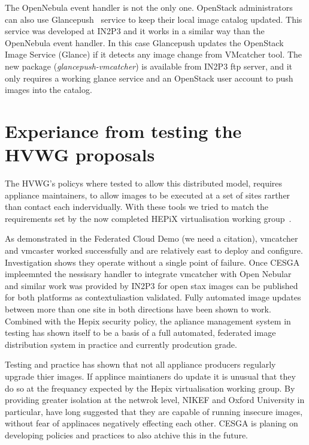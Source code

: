 \documentclass{llncs_Ibergrid2013}
\begin{document}
The OpenNebula event handler is not the only one. OpenStack administrators can also use Glancepush~\cite{glancepush} service to keep their local image catalog updated. 
This service was developed at IN2P3 and it works in a similar way than the OpenNebula event handler. 
In this case Glancepush updates the OpenStack Image Service (Glance) if it detects any image change from VMcatcher tool. 
The new package (\textit{glancepush-vmcatcher}) is available from IN2P3 ftp server, and it only requires a working glance service and an OpenStack user account to push images into the catalog.



\section{Experiance from testing the HVWG proposals}
\label{sect-experiances}

The HVWG's policys where tested to allow this distributed model, requires appliance maintainers, to allow images to be executed at a set of sites rarther than contact each indervidually. With these tools we tried to match the requirements set by the now completed HEPiX virtualisation working group~\cite{hepix}.

As demonstrated in the Federated Cloud Demo (we need a citation), vmcatcher and vmcaster worked successfully and are relatively east to deploy and configure. Investigation shows they operate without a single point of failure. Once CESGA impleemnted the nessisary handler to integrate vmcatcher with Open Nebular and similar work was provided by IN2P3 for open stax images can be published for both platforms as contextuliastion validated. Fully automated image updates between more than one site in both directions have been shown to work. Combined with the Hepix security policy, the apliance management system in testing has shown itself to be a basis of a full automated, federated image distribution system in practice and currently prodcution grade.

Testing and practice has shown that not all appliance producers regularly upgrade thier images. If applince maintianers do update it is unusual that they do so at the frequancy expected by the Hepix virtualisation working group. By providing greater isolation at the netwrok level, NIKEF and Oxford University in particular, have long suggested that they are capable of running insecure images, without fear of applinaces negatively effecting each other. CESGA is planing on developing policies and practices to also atchive this in the future. 
\end{document}
